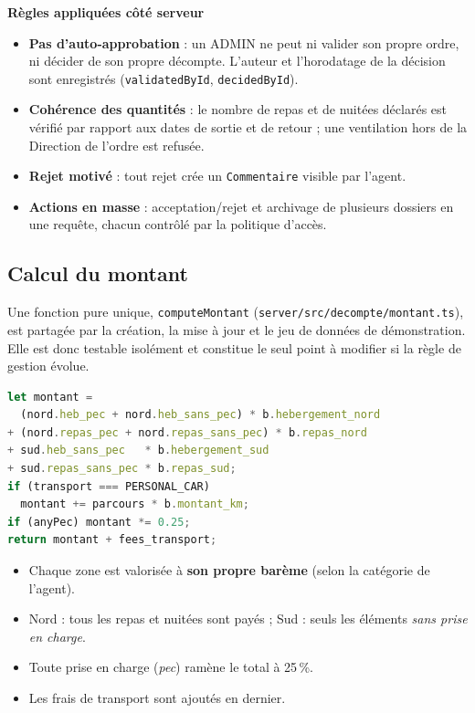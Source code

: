 \documentclass[10.5pt,a4paper]{article}
\newcommand{\code}[1]{\texttt{\small #1}}
\begin{document}
\textbf{Règles appliquées côté serveur}
\begin{itemize}
  \item \textbf{Pas d'auto-approbation} : un ADMIN ne peut ni valider son propre ordre, ni décider de son propre décompte. L'auteur et l'horodatage de la décision sont enregistrés (\code{validatedById}, \code{decidedById}).
  \item \textbf{Cohérence des quantités} : le nombre de repas et de nuitées déclarés est vérifié par rapport aux dates de sortie et de retour ; une ventilation hors de la Direction de l'ordre est refusée.
  \item \textbf{Rejet motivé} : tout rejet crée un \code{Commentaire} visible par l'agent.
  \item \textbf{Actions en masse} : acceptation/rejet et archivage de plusieurs dossiers en une requête, chacun contrôlé par la politique d'accès.
\end{itemize}

\subsection{Calcul du montant}
Une fonction pure unique, \code{computeMontant} (\code{server/src/decompte/montant.ts}), est partagée par la
création, la mise à jour et le jeu de données de démonstration. Elle est donc testable isolément et
constitue le seul point à modifier si la règle de gestion évolue.

\begin{minipage}[t]{0.52\textwidth}
\vspace{0pt}
\begin{lstlisting}[language=TypeScript]
let montant =
  (nord.heb_pec + nord.heb_sans_pec) * b.hebergement_nord
+ (nord.repas_pec + nord.repas_sans_pec) * b.repas_nord
+ sud.heb_sans_pec   * b.hebergement_sud
+ sud.repas_sans_pec * b.repas_sud;
if (transport === PERSONAL_CAR)
  montant += parcours * b.montant_km;
if (anyPec) montant *= 0.25;
return montant + fees_transport;
\end{lstlisting}
\end{minipage}\hfill
\begin{minipage}[t]{0.45\textwidth}
\vspace{0pt}
\small
\begin{itemize}
  \item Chaque zone est valorisée à \textbf{son propre barème} (selon la catégorie de l'agent).
  \item Nord : tous les repas et nuitées sont payés ; Sud : seuls les éléments \emph{sans prise en charge}.
  \item Toute prise en charge (\emph{pec}) ramène le total à 25\,\%.
  \item Les frais de transport sont ajoutés en dernier.
\end{itemize}
\end{minipage}
\end{document}
